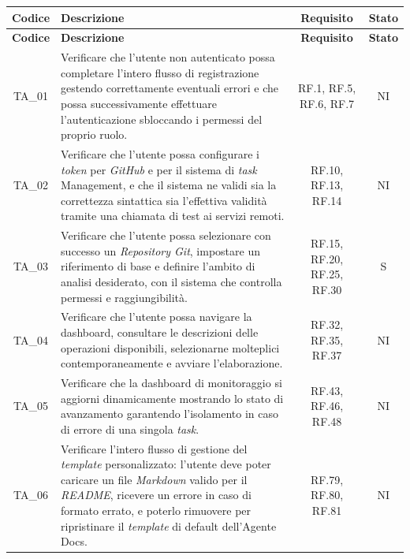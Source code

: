 \documentclass[12pt, a4paper]{article}
\newlength{\LargColVal} %
\begin{document}
\renewcommand{\arraystretch}{1.3}
\begin{xltabular}{\textwidth}{|c|X|C{\LargColVal}|C{\LargColVal}|}

    \hline
    \textbf{Codice} & \textbf{Descrizione} & \textbf{Requisito} & \textbf{Stato} \\ \hline
    \endfirsthead

    \hline
    \textbf{Codice} & \textbf{Descrizione} & \textbf{Requisito} & \textbf{Stato} \\ \hline
    \endhead

    TA\_01 & Verificare che l'utente non autenticato possa completare l'intero flusso di registrazione gestendo correttamente eventuali errori e che possa successivamente effettuare l'autenticazione sbloccando i permessi del proprio ruolo. & RF.1, RF.5, RF.6, RF.7 & NI \\ \hline

    TA\_02 & Verificare che l'utente possa configurare i \textit{token} per \textit{GitHub} e per il sistema di \textit{task} Management, e che il sistema ne validi sia la correttezza sintattica sia l'effettiva validità tramite una chiamata di test ai servizi remoti. & RF.10, RF.13, RF.14 & NI \\ \hline

    TA\_03 & Verificare che l'utente possa selezionare con successo un \textit{ Repository Git}, impostare un riferimento di base e definire l'ambito di analisi desiderato, con il sistema che controlla permessi e raggiungibilità. & RF.15, RF.20, RF.25, RF.30 & S \\ \hline

    TA\_04 & Verificare che l'utente possa navigare la dashboard, consultare le descrizioni delle operazioni disponibili, selezionarne molteplici contemporaneamente e avviare l'elaborazione. & RF.32, RF.35, RF.37 & NI \\ \hline

    TA\_05 & Verificare che la dashboard di monitoraggio si aggiorni dinamicamente mostrando lo stato di avanzamento garantendo l'isolamento in caso di errore di una singola \textit{task}. & RF.43, RF.46, RF.48 & NI \\ \hline

    TA\_06 & Verificare l'intero flusso di gestione del \textit{template} personalizzato: l'utente deve poter caricare un file \textit{Markdown} valido per il \textit{README}, ricevere un errore in caso di formato errato, e poterlo rimuovere per ripristinare il \textit{template} di default dell'Agente Docs. & RF.79, RF.80, RF.81 & NI \\ \hline


\end{xltabular}
\end{document}
